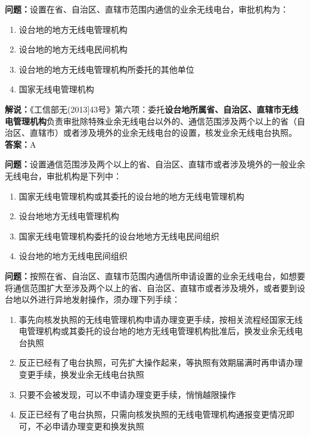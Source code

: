 \textbf{问题：}设置在省、自治区、直辖市范围内通信的业余无线电台，审批机构为：
\begin{enumerate}[label=\Alph*), leftmargin=1cm]
	\item 设台地的地方无线电管理机构
	\item 设台地的地方无线电民间机构
	\item 设台地的地方无线电管理机构所委托的其他单位
	\item 国家无线电管理机构
\end{enumerate}
\textbf{解说：}《工信部无(2013]43号》第六项：委托\textbf{设台地所属省、自治区、直辖市无线电管理机构}负责审批除特殊业余无线电台以外的、通信范围涉及两个以上的省（自治区、直辖市）或者涉及境外的业余无线电台的设置，核发业余无线电台执照。\\\textbf{答案：}A

\textbf{问题：}设置通信范围涉及两个以上的省、自治区、直辖市或者涉及境外的一般业余无线电台，审批机构是下列中：
\begin{enumerate}[label=\Alph*), leftmargin=1cm]
	\item 国家无线电管理机构或其委托的设台地的地方无线电管理机构
	\item 设台地地方无线电管理机构
	\item 国家无线电管理机构委托的设台地地方无线电民间组织
	\item 设台地的地方无线电民间组织
\end{enumerate}

\textbf{问题：}按照在省、自治区、直辖市范围内通信所申请设置的业余无线电台，如想要将通信范围扩大至涉及两个以上的省、自治区、直辖市或者涉及境外，或者要到设台地以外进行异地发射操作，须办理下列手续：
\begin{enumerate}[label=\Alph*), leftmargin=1cm]
	\item 事先向核发执照的无线电管理机构申请办理变更手续，按相关流程经国家无线电管理机构或其委托的设台地的地方无线电管理机构批准后，换发业余无线电台执照
	\item 反正已经有了电台执照，可先扩大操作起来，等执照有效期届满时再申请办理变更手续，换发业余无线电台执照
	\item 只要不会被发现，可以不申请办理变更手续，悄悄越限操作
	\item 反正已经有了电台执照，只需向核发执照的无线电管理机构通报变更情况即可，不必申请办理变更和换发执照
\end{enumerate}

